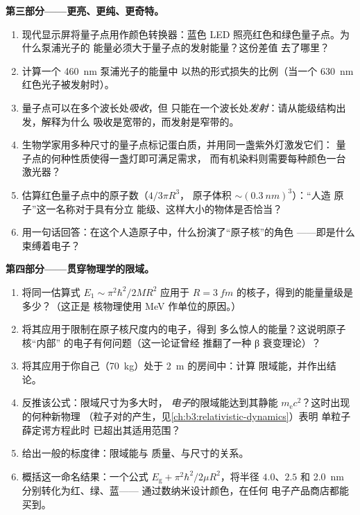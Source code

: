\begin{problem}
\medskip\noindent\textbf{第三部分——更亮、更纯、更奇特。}
\begin{enumerate}[resume]
  \item 现代显示屏将量子点用作颜色转换器：蓝色 LED
        照亮红色和绿色量子点。为什么泵浦光子的
        能量必须大于量子点的发射能量？这份差值
        去了哪里？
  \item 计算一个 \qty{460}{nm} 泵浦光子的能量中
        以热的形式损失的比例（当一个 \qty{630}{nm} 红色光子被发射时）。
  \item 量子点可以在多个波长处\emph{吸收}，但
        只能在一个波长处\emph{发射}：请从能级结构出发，解释为什么
        吸收是宽带的，而发射是窄带的。
  \item 生物学家用多种尺寸的量子点标记蛋白质，并用同一盏紫外灯激发它们：
        量子点的何种性质使得一盏灯即可满足需求，
        而有机染料则需要每种颜色一台激光器？
  \item 估算红色量子点中的原子数（$4/3\pi R^3$，
        原子体积 $\sim(\qty{0.3}{nm})^3$）：“人造
        原子”这一名称对于具有分立
        能级、这样大小的物体是否恰当？
  \item 用一句话回答：在这个人造原子中，什么扮演了“原子核”的角色
        ——即是什么束缚着电子？
\end{enumerate}

\medskip\noindent\textbf{第四部分——贯穿物理学的限域。}
\begin{enumerate}[resume]
  \item 将同一估算式 $E_1 \sim \pi^2\hbar^2/2MR^2$ 应用于
        $R = \qty{3}{fm}$ 的核子，得到的能量量级是多少？（这正是
        核物理使用 MeV 作单位的原因。）
  \item 将其应用于限制在原子核尺度内的电子，得到
        多么惊人的能量？这说明原子核“内部”
        的电子有何问题（这一论证曾经
        推翻了一种 β 衰变理论）？
  \item 将其应用于你自己（\qty{70}{kg}）处于 \qty{2}{m} 的房间中：计算
        限域能，并作出结论。
  \item 反推该公式：限域尺寸为多大时，
        \emph{电子}的限域能达到其静能
        $m_{\text{e}}c^2$？这时出现的何种新物理
        （粒子对的产生，见\cref{ch:b3:relativistic-dynamics}）表明
        单粒子薛定谔方程此时
        已超出其适用范围？
  \item 给出一般的标度律：限域能与
        质量、与尺寸的关系。
  \item 概括这一命名结果：一个公式
        $E_{\text{g}} + \pi^2\hbar^2/2\mu R^2$，将半径
        $4.0$、$2.5$ 和 \qty{2.0}{nm} 分别转化为红、绿、蓝——
        通过数纳米设计颜色，在任何
        电子产品商店都能买到。
\end{enumerate}
\end{problem}
